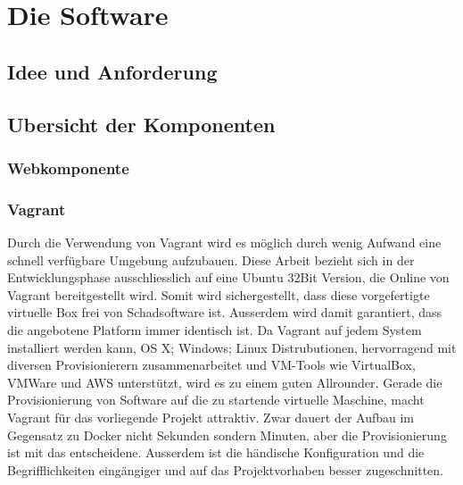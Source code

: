 \setcounter{secnumdepth}{3}
\chapter{Die Software}
\section{Idee und Anforderung}
\section{Ubersicht der Komponenten}
\subsection{Webkomponente}
\subsection{Vagrant}

Durch die Verwendung von Vagrant wird es möglich durch wenig Aufwand eine schnell verfügbare Umgebung aufzubauen.
Diese Arbeit bezieht sich in der Entwicklungsphase ausschliesslich auf eine Ubuntu 32Bit Version, die Online von Vagrant bereitgestellt wird.
Somit wird sichergestellt, dass diese vorgefertigte virtuelle Box frei von Schadsoftware ist. Ausserdem wird damit garantiert, dass die angebotene Platform immer identisch ist.
Da Vagrant auf jedem System installiert werden kann, OS X; Windows; Linux Distrubutionen, hervorragend mit diversen Provisionierern zusammenarbeitet und VM-Tools wie VirtualBox, VMWare und AWS unterstützt, wird es zu einem guten Allrounder. 
Gerade die Provisionierung von Software auf die zu startende virtuelle Maschine, macht Vagrant für das vorliegende Projekt attraktiv.
Zwar dauert der Aufbau im Gegensatz zu Docker nicht Sekunden sondern Minuten, aber die Provisionierung ist mit das entscheidene.
Ausserdem ist die händische Konfiguration und die Begrifflichkeiten eingängiger und auf das Projektvorhaben besser zugeschnitten.



